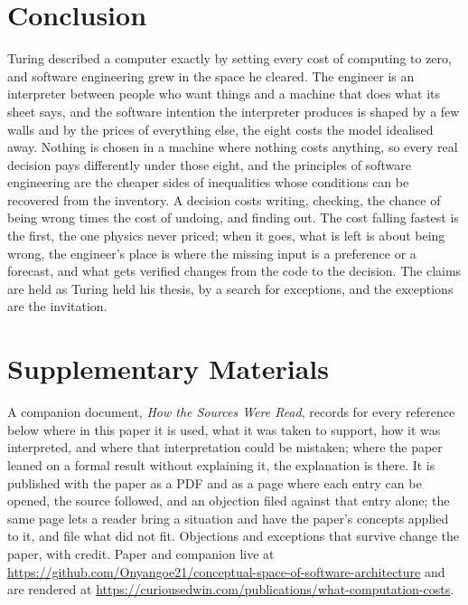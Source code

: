 \documentclass[11pt,oneside]{article}
\theoremstyle{definition}
\theoremstyle{remark}
\begin{document}
\section{Conclusion}
Turing described a computer exactly by setting every cost of computing to zero, and
software engineering grew in the space he cleared. The engineer is an interpreter between people who
want things and a machine that does what its sheet says, and the software intention the
interpreter produces is shaped by a few walls and by the prices of everything else, the
eight costs the model idealised away. Nothing is chosen in a machine where nothing costs anything, so every real decision pays
differently under those eight, and the principles of software engineering are the cheaper sides
of inequalities whose conditions can be recovered from the inventory. A decision costs
writing, checking, the chance of being wrong times the cost of undoing, and finding out.
The cost falling fastest is the first, the one physics never priced; when it goes, what is
left is about being wrong, the engineer's place is where the missing input is a preference
or a forecast, and what gets verified changes from the code to the decision. The claims are held as Turing held his thesis, by a search for exceptions, and the
exceptions are the invitation.

\section*{Supplementary Materials}
A companion document, \emph{How the Sources Were Read}, records for every reference below
where in this paper it is used, what it was taken to support, how it was interpreted, and
where that interpretation could be mistaken; where the paper leaned on a formal result
without explaining it, the explanation is there. It is published with the paper as a PDF
and as a page where each entry can be opened, the source followed, and an objection filed
against that entry alone; the same page lets a reader bring a situation and have the
paper's concepts applied to it, and file what did not fit. Objections and exceptions that
survive change the paper, with credit. Paper and companion live at
\url{https://github.com/Onyangoe21/conceptual-space-of-software-architecture} and are
rendered at \url{https://curiousedwin.com/publications/what-computation-costs}.
\end{document}
